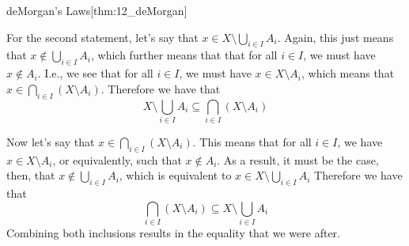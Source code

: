\begin{thmBox}{deMorgan's Laws}[thm:12_deMorgan]
\begin{proofBox}
        \baseSkip

        For the second statement, let's say that 
        \( x \in X \setminus \bigcup_{ i \in I } A_{ i } \).
        Again, this just means that 
        \( x \notin \bigcup_{ i \in I } A_{ i } \), which further means that 
        that for all \( i \in I \), we must have \( x \notin A_{ i } \). 
        I.e., we see that for all \( i \in I \), we must have  
        \( x \in X \setminus A_{ i } \), which means that 
        \( x \in \bigcap_{ i \in I } ( X \setminus A_{ i } ) \).
        Therefore we have that 
        \begin{equation*}
            X \setminus \bigcup_{ i \in I } A_{ i }
            \subseteq
            \bigcap_{ i \in I } ( X \setminus A_{ i } )
        \end{equation*}

        \pagebreak

        Now let's say that 
        \( x \in \bigcap_{ i \in I } ( X \setminus A_{ i } ) \). 
        This means that for all \( i \in I \), we have
        \( x \in X \setminus A_{ i } \), or equivalently, such that 
        \( x \notin A_{ i } \). 
        As a result, it must be the case, then, that 
        \( x \notin \bigcup_{ i \in I } A_{ i } \), which is equivalent to 
        \( x \in X \setminus \bigcup_{ i \in I } A_{ i } \)
        Therefore we have that 
        \begin{equation*}
            \bigcap_{ i \in I } ( X \setminus A_{ i } )
            \subseteq
            X \setminus \bigcup_{ i \in I } A_{ i }
        \end{equation*}
        Combining both inclusions results in the equality that we were after.
    \end{proofBox}
\end{thmBox}